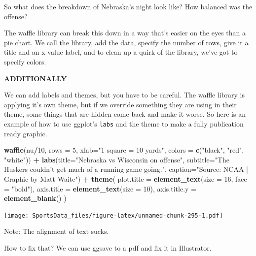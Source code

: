 \documentclass[
]{book}
\newenvironment{Shaded}{\begin{snugshade}}{\end{snugshade}}
\newcommand{\DataTypeTok}[1]{\textcolor[rgb]{0.13,0.29,0.53}{#1}}
\newcommand{\DecValTok}[1]{\textcolor[rgb]{0.00,0.00,0.81}{#1}}
\newcommand{\KeywordTok}[1]{\textcolor[rgb]{0.13,0.29,0.53}{\textbf{#1}}}
\newcommand{\NormalTok}[1]{#1}
\newcommand{\OperatorTok}[1]{\textcolor[rgb]{0.81,0.36,0.00}{\textbf{#1}}}
\newcommand{\StringTok}[1]{\textcolor[rgb]{0.31,0.60,0.02}{#1}}
\begin{document}
So what does the breakdown of Nebraska's night look like? How balanced was the offense?

The waffle library can break this down in a way that's easier on the eyes than a pie chart. We call the library, add the data, specify the number of rows, give it a title and an x value label, and to clean up a quirk of the library, we've got to specify colors.

\textbf{ADDITIONALLY}

We can add labels and themes, but you have to be careful. The waffle library is applying it's own theme, but if we override something they are using in their theme, some things that are hidden come back and make it worse. So here is an example of how to use ggplot's \texttt{labs} and the theme to make a fully publication ready graphic.

\begin{Shaded}
\begin{Highlighting}[]
\KeywordTok{waffle}\NormalTok{(nu}\OperatorTok{/}\DecValTok{10}\NormalTok{, }\DataTypeTok{rows =} \DecValTok{5}\NormalTok{, }\DataTypeTok{xlab=}\StringTok{"1 square = 10 yards"}\NormalTok{, }\DataTypeTok{colors =} \KeywordTok{c}\NormalTok{(}\StringTok{"black"}\NormalTok{, }\StringTok{"red"}\NormalTok{, }\StringTok{"white"}\NormalTok{)) }\OperatorTok{+}\StringTok{ }\KeywordTok{labs}\NormalTok{(}\DataTypeTok{title=}\StringTok{"Nebraska vs Wisconsin on offense"}\NormalTok{, }\DataTypeTok{subtitle=}\StringTok{"The Huskers couldn't get much of a running game going."}\NormalTok{, }\DataTypeTok{caption=}\StringTok{"Source: NCAA | Graphic by Matt Waite"}\NormalTok{) }\OperatorTok{+}\StringTok{ }
\StringTok{  }\KeywordTok{theme}\NormalTok{(}
    \DataTypeTok{plot.title =} \KeywordTok{element_text}\NormalTok{(}\DataTypeTok{size =} \DecValTok{16}\NormalTok{, }\DataTypeTok{face =} \StringTok{"bold"}\NormalTok{),}
    \DataTypeTok{axis.title =} \KeywordTok{element_text}\NormalTok{(}\DataTypeTok{size =} \DecValTok{10}\NormalTok{),}
    \DataTypeTok{axis.title.y =} \KeywordTok{element_blank}\NormalTok{()}
\NormalTok{  )}
\end{Highlighting}
\end{Shaded}

\texttt{[image: SportsData\_files/figure-latex/unnamed-chunk-295-1.pdf]}

Note: The alignment of text sucks.

How to fix that? We can use ggsave to a pdf and fix it in Illustrator.
\end{document}
